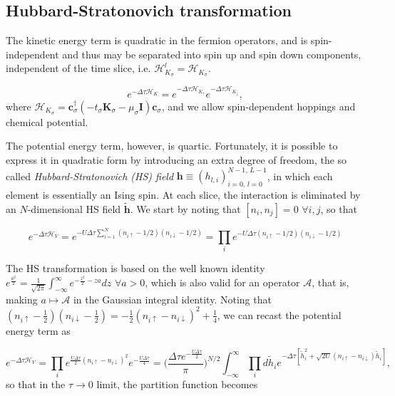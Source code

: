 \subsection{Hubbard-Stratonovich transformation}\label{subsec:HStransf}

The kinetic energy term is quadratic in the fermion operators, and is spin-independent and thus may be separated into spin up and spin down components, independent of the time slice, i.e. $\mathcal{H}_{K_\sigma}^l = \mathcal{H}_{K_\sigma}$.

\begin{equation}
e^{-\Delta\tau \mathcal{H}_K} = e^{-\Delta\tau \mathcal{H}_{K_\uparrow}} e^{-\Delta\tau \mathcal{H}_{K_\downarrow}} ,
\end{equation}
where $\mathcal{H}_{K_\sigma} = \bm c_\sigma^\dagger (-t_\sigma \bm K_\sigma - \mu_\sigma \bm I )  \bm c_\sigma$, and we allow spin-dependent hoppings and chemical potential.

The potential energy term, however, is quartic.
Fortunately, it is possible to express it in quadratic form by introducing an extra degree of freedom, the so called \emph{Hubbard-Stratonovich (HS) field} $\bm h \equiv (h_{l, i})_{i=0,\, l= 0}^{N-1, \, L - 1}$, in which each element is essentially an Ising spin.
At each slice, the interaction is eliminated by an $N$-dimensional HS field $\widetilde{\bm h}$.
We start by noting that $[ n_i , n_j ] = 0 \,\, \forall i, j$, so that

\begin{equation}\label{eq:Hint}
e^{-\Delta\tau \mathcal{H}_V} = e^{-U \Delta\tau \sum_{i=1}^N (n_{i\uparrow} - 1/2 ) (n_{i\downarrow} - 1/2 )} = \prod_i e^{-U \Delta\tau (n_{i\uparrow} - 1/2 ) (n_{i\downarrow} - 1/2 )}
\end{equation}

The HS transformation is based on the well known identity 
$
e^{ \frac{a^2}{2}} = \frac{1}{\sqrt{2\pi}} \int_{-\infty}^{\infty} e^{-\frac{z^2}{2}  - za } dz
$ 
$ \forall a > 0$, 
which is also valid for an operator $\mathcal{A}$, that is, making $a \mapsto \mathcal{A}$ in the Gaussian integral identity.
Noting that $(n_{i\uparrow} - \frac{1}{2} ) (n_{i\downarrow} - \frac{1}{2} ) = -\frac{1}{2} ( n_{i\uparrow} - n_{i\downarrow} )^2 + \frac{1}{4}$, we can recast the potential energy term as

\begin{equation}
e^{-\Delta\tau \mathcal{H}_V} = \prod_i e^{ \frac{U \Delta \tau}{2} ( n_{i\uparrow} - n_{i\downarrow} )^2 } e^{- \frac{U \Delta \tau}{4}}
=\bigg( \frac{\Delta \tau e^{- \frac{U \Delta \tau}{2}}}{\pi} \bigg)^{N/2} \int_{-\infty}^\infty \prod_i d \widetilde{h}_i e^{-\Delta \tau [ \widetilde{h}_i^2 + \sqrt{2U} ( n_{i\uparrow} - n_{i\downarrow} ) \widetilde{h}_i ]} ,
\end{equation}
so that in the $\tau \rightarrow 0$ limit, the partition function becomes

